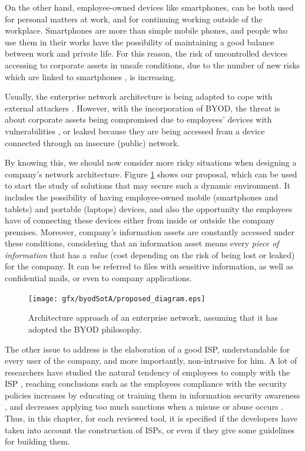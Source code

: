 On the other hand, employee-owned devices like smartphones, can be both used for personal matters at work, and for continuing working outside of the workplace. Smartphones are more than simple mobile phones, and people who use them in their works have the possibility of maintaining a good balance between work and private life. For this reason, the risk of uncontrolled devices accessing to corporate assets in unsafe conditions, due to the number of new risks which are linked to smartphones \cite{gangula2013survey}, is increasing.

Usually, the enterprise network architecture is being adapted to cope with external attackers \cite{MIT05}. However, with the incorporation of BYOD, the threat is about corporate assets being compromised due to employees' devices with vulnerabilities \cite{android11}, or leaked because they are being accessed from a device connected through an insecure (public) network.

By knowing this, we should now consider more risky situations when designing a company's network architecture. Figure \ref{fig:proposed_diagram} shows our proposal, which can be used to start the study of solutions that may secure such a dynamic environment. It includes the possibility of having employee-owned mobile (smartphones and tablets) and portable (laptops) devices, and also the opportunity the employees have of connecting these devices either from inside or outside the company premises. Moreover, company's information assets are constantly accessed under these conditions, considering that an information asset means every \textit{piece of information} that has a \textit{value} (cost depending on the risk of being lost or leaked) for the company. It can be referred to files with sensitive information, as well as confidential mails, or even to company applications.

\begin{figure}
\centering
	\texttt{[image: gfx/byodSotA/proposed\_diagram.eps]}
	\caption{Architecture approach of an enterprise network, assuming that it has adopted the BYOD philosophy.}
	\label{fig:proposed_diagram}
\end{figure}

The other issue to address is the elaboration of a good ISP, understandable for every user of the company, and more importantly, non-intrusive for him. A lot of researchers have studied the natural tendency of employees to comply with the ISP \cite{SecPolComp10,SecPolComp12,SecPolComp14}, reaching conclusions such as the employees compliance with the security policies increases by educating or training them in information security awareness \cite{SecPolComp09}, and decreases applying too much sanctions when a misuse or abuse occurs \cite{SecPolPenalty09}. Thus, in this chapter, for each reviewed tool, it is specified if the developers have taken into account the construction of ISPs, or even if they give some guidelines for building them. 

